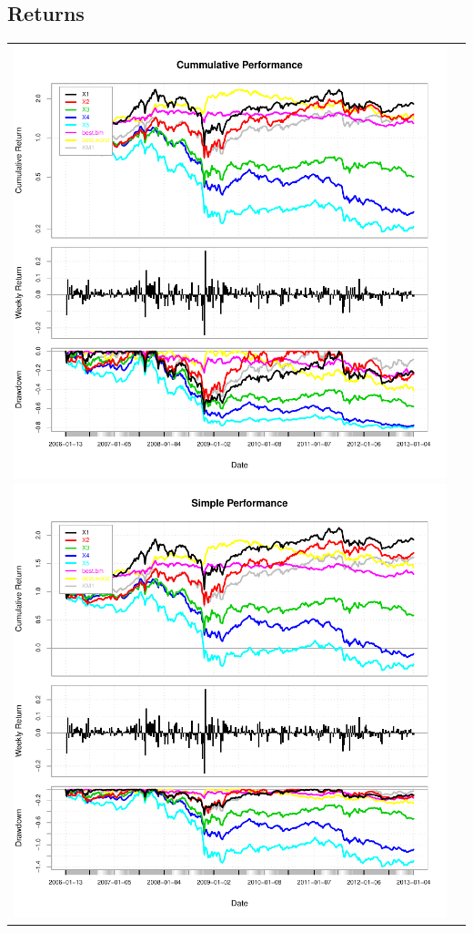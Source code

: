\documentclass{article}
\begin{document}
\subsection{Returns}
\begin{tabular}{cc}
\includegraphics{graphics/plot-004}
\includegraphics{graphics/plot-005}
\end{tabular}
\end{document}
